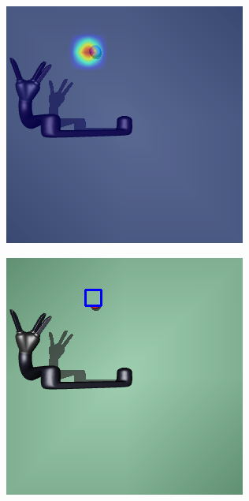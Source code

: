 \begin{figure}[h!]
\begin{subfigure}{0.24\columnwidth}
  \end{subfigure}
  \begin{subfigure}{0.24\columnwidth}
    \includegraphics[width=\linewidth]{figures/chapter6/occ_jaco_average_map.png}
  \end{subfigure}
  \begin{subfigure}{0.24\columnwidth}
    \includegraphics[width=\linewidth]{figures/chapter6/average_map_mask.png}

\end{subfigure}
\end{figure}
